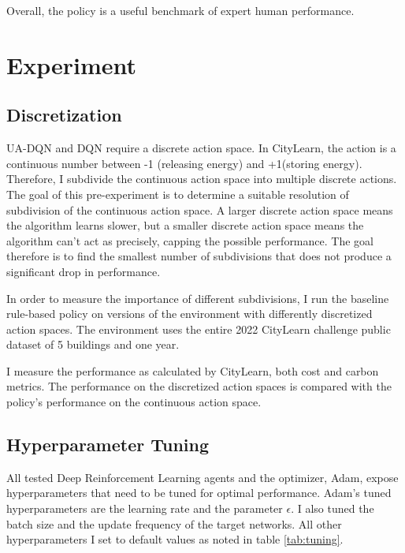 Overall, the policy is a useful benchmark of expert human performance.

\section{Experiment} %

\subsection{Discretization} \label{sec:discretization}
UA-DQN and DQN require a discrete action space.
In CityLearn, the action is a continuous number between -1 (releasing energy) and +1(storing energy).
Therefore, I subdivide the continuous action space into multiple discrete actions.
The goal of this pre-experiment is to determine a suitable resolution of subdivision of the continuous action space.
A larger discrete action space means the algorithm learns slower, but a smaller discrete action space means the algorithm can't act as precisely, capping the possible performance.
The goal therefore is to find the smallest number of subdivisions that does not produce a significant drop in performance.

In order to measure the importance of different subdivisions, I run the baseline rule-based policy on versions of the environment with differently discretized action spaces.
The environment uses the entire 2022 CityLearn challenge public dataset of 5 buildings and one year.

I measure the performance as calculated by CityLearn, both cost and carbon metrics.
The performance on the discretized action spaces is compared with the policy's performance on the continuous action space.

\subsection{Hyperparameter Tuning}
All tested Deep Reinforcement Learning agents and the optimizer, Adam, expose hyperparameters that need to be tuned for optimal performance.
Adam's tuned hyperparameters are the learning rate and the parameter $\epsilon$.
I also tuned the batch size and the update frequency of the target networks.
All other hyperparameters I set to default values as noted in table \ref{tab:tuning}.

